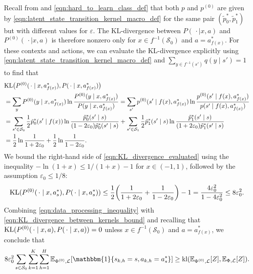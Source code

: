 \documentclass[11pt]{article}
\newcommand{\mcL}{\mathcal{L}}
\newcommand{\mcS}{\mathcal{S}}
\newcommand{\mbbE}{\mathbb{E}}
\newcommand{\KL}{\textnormal{KL}}
\theoremstyle{definition}
\theoremstyle{definition}
\begin{document}
Recall from  and \eqref{eqn:hard_to_learn_class_def} that both $p$ and $p^{(0)}$ are given by \eqref{eqn:latent_state_transition_kernel_macro_def} for the same pair $(\tilde{p}^*_0,\tilde{p}^*_1)$ but with different values for $\varepsilon$.
The KL-divergence between $P(\,\cdot\mid x,a)$ and $P^{(0)}(\,\cdot\mid x,a)$ is therefore nonzero only for $x\in f^{-1}(\mcS_0)$ and $a=a^*_{f(x)}$.
For these contexts and actions, we can evaluate the KL-divergence explicitly using \eqref{eqn:latent_state_transition_kernel_macro_def} and $\sum_{y\in f^{-1}(s')}q(y\mid s')=1$ to find that
\begin{align}
		&
	\KL\bigl(
	P^{(0)}(\,\cdot\mid x,a_{f(x)}^*)
	,
	P(\,\cdot\mid x,a_{f(x)}^*)
	\bigr)
	\nonumber
	\\
		&
	=
	\sum_{y}
	P^{(0)}(y\mid x,a_{f(x)}^*)\ln\frac{P^{(0)}(y\mid x,a_{f(x)}^*)}{P(y\mid x,a_{f(x)}^*)}
	=
	\sum_{s'}
	p^{(0)}(s'\mid f(x),a_{f(x)}^*)\ln\frac{p^{(0)}(s'\mid f(x),a_{f(x)}^*)}{p(s'\mid f(x),a_{f(x)}^*)}
	\nonumber
	\\
		&
	=
	\sum_{s'\in\mcS_0}
	\frac{1}{2}
	\tilde{p}^*_0(s' \mid f(x))\ln \frac{\tilde{p}^*_0(s' \mid s)}{(1-2\varepsilon_0)\tilde{p}^*_0(s' \mid s)}
	+
	\sum_{s'\in\mcS_1}
	\frac{1}{2}
	\tilde{p}^*_1(s' \mid s)\ln \frac{\tilde{p}^*_1(s' \mid s)}{(1+2\varepsilon_0)\tilde{p}^*_1(s' \mid s)}
	\nonumber
	\\
		&
	=
	\frac{1}{2}
	\ln \frac{1}{1+2\varepsilon_0}
	+
	\frac{1}{2}
	\ln\frac{1}{1-2\varepsilon_0}
	.
	\label{eqn:KL_divergence_evaluated}
\end{align}
We bound the right-hand side of \eqref{eqn:KL_divergence_evaluated} using the inequality $-\ln (1+x)\leq 1/(1+x)-1$ for $x\in(-1,1)$, followed by the assumption $\varepsilon_0\leq 1/8$:
\begin{equation}
	\label{eqn:KL_divergence_between_kernels_bound}
	\begin{split}
		\KL(P^{(0)}(\,\cdot\mid x,a_s^*),P(\,\cdot\mid x,a_s^*))
		\leq
		\frac{1}{2}
		\biggl(
		\frac{1}{1+2\varepsilon_0}
		+
		\frac{1}{1-2\varepsilon_0}
		\biggr)
		-
		1
		=
		\frac{4\varepsilon_0^2}{1-4\varepsilon_0^2}
		\leq
		8\varepsilon_0^2.
	\end{split}
\end{equation}
Combining \eqref{eqn:data_processing_inequality} with \eqref{eqn:KL_divergence_between_kernels_bound} and recalling that $\KL(P^{(0)}(\,\cdot\mid x,a),P(\,\cdot\mid x,a))=0$ unless $x\in f^{-1}(\mcS_0)$ and $a=a^*_{f(x)}$, we conclude that
\begin{equation}
	\label{eqn:data_processing_inequality_with_bounded_KL_divergence}
	\begin{split}
		8\varepsilon_0^2
		\sum_{s\in\mcS_0}
		\sum_{k=1}^K
		\sum_{h=1}^H
		\mbbE_{\Phi^{(0)},\mcL}[\mathbbm{1}\{s_{k,h}=s,a_{k,h}=a_s^*\}]
		\geq
		\textnormal{kl}(
		\mbbE_{\Phi^{(0)},\mcL}[Z],
		\mbbE_{\Phi,\mcL}[Z]
		)
		.
	\end{split}
\end{equation}
\end{document}
